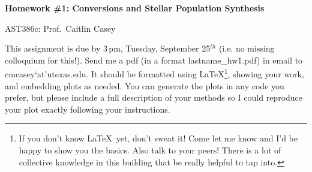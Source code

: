 \documentclass[11pt]{article}
\begin{document}
\begin{center}
\textbf{\large Homework \#1: Conversions and Stellar Population Synthesis}
\vspace{2mm}

{\sc AST386c: Prof.\ Caitlin Casey}
\end{center}
\vspace{4mm}

\noindent This assignment is due by 3\,pm, Tuesday, September
25$^{th}$ (i.e. no missing colloquium for this!).  Send me a pdf (in a
format lastname\_hw1.pdf) in email to cmcasey`at'utexas.edu.  It
should be formatted using \LaTeX\footnote{If you don't know
  \LaTeX\ yet, don't sweat it!  Come let me know and I'd be happy to
  show you the basics.  Also talk to your peers! There is a lot of
  collective knowledge in this building that be really helpful to tap
  into. }, showing your work, and embedding plots as needed.  You can
generate the plots in any code you prefer, but please include a full
description of your methods so I could reproduce your plot exactly
following your instructions.

\vspace{4mm}
\end{document}

